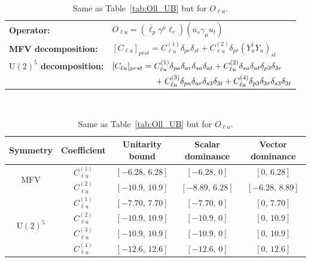 \begin{table}[tbp]
\centering
{\small
\begin{tabular}{ll}
    \textbf{Operator:} &
        $\boxed{O_{\ell u} = (\overline\ell_p \gamma^\mu \ell_r)(\overline u_s \gamma_\mu u_t)}$ \\[0.2cm]
    \textbf{MFV decomposition:} &
        $[C_{\ell u}]_{prst} = C_{\ell u}^{(1)}\delta_{pr}\delta_{st} + C_{\ell u}^{(2)}\delta_{pr}(Y_u^\dagger Y_u)_{st}$ \\[0.15cm]
    \textbf{$\mathrm{U}(2)^5$ decomposition:} &
        $[C_{\ell u}]_{prst} =
            C_{\ell u}^{(1)}\Pij{p}{r}{a}\Pij{s}{t}{a}
            + C_{\ell u}^{(2)}\Pij{s}{t}{a}\delta_{p3}\delta_{3r}$ \\
        & $\phantom{[C_{\ell u}]_{prst} ={}}+ C_{\ell u}^{(3)}\Pij{p}{r}{a}\delta_{s3}\delta_{3t}
            + C_{\ell u}^{(4)}\delta_{p3}\delta_{3r}\delta_{s3}\delta_{3t}$ \\
\end{tabular}
\\[0.3cm]
\renewcommand{\arraystretch}{1.3}
\begin{tabular}{ccccc}
    \toprule
    \rowcolor{hdrcolor}
    \textbf{Symmetry} & \textbf{Coefficient}
        & \textbf{Unitarity bound}
        & \textbf{Scalar dominance}
        & \textbf{Vector dominance} \\
    \midrule
    \multirow{2}{*}{MFV}
        & $C_{\ell u}^{(1)}$ & $[-6.28,\, 6.28]$  & $[-6.28,\, 0]$    & $[0,\, 6.28]$    \\
        & $C_{\ell u}^{(2)}$ & $[-10.9,\, 10.9]$  & $[-8.89,\, 6.28]$ & $[-6.28,\, 8.89]$ \\
    \midrule
    \multirow{4}{*}{$\mathrm{U}(2)^5$}
        & $C_{\ell u}^{(1)}$ & $[-7.70,\, 7.70]$ & $[-7.70,\, 0]$ & $[0,\, 7.70]$ \\
        & $C_{\ell u}^{(2)}$ & $[-10.9,\, 10.9]$ & $[-10.9,\, 0]$ & $[0,\, 10.9]$ \\
        & $C_{\ell u}^{(3)}$ & $[-10.9,\, 10.9]$ & $[-10.9,\, 0]$ & $[0,\, 10.9]$ \\
        & $C_{\ell u}^{(4)}$ & $[-12.6,\, 12.6]$ & $[-12.6,\, 0]$ & $[0,\, 12.6]$ \\
    \bottomrule
\end{tabular}}
\caption{Same as Table~\ref{tab:Oll_UB} but for $O_{\ell u}$.}
\label{tab:Olu_UB}
\end{table}

